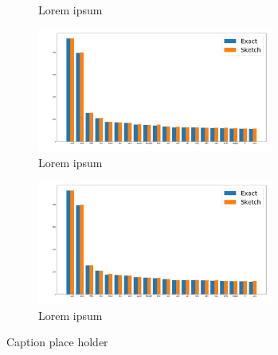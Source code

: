 \documentclass[shortpaper]{revdetua}
\begin{document}
\begin{figure}[]
\begin{subfigure}[t]{0.5\textwidth}
        \caption{Lorem ipsum}
    \end{subfigure}
    \begin{subfigure}[t]{0.5\textwidth}
        \includegraphics[height=1.6in]{englishAlice1000_8.png}
        \caption{Lorem ipsum}
    \end{subfigure}
    \begin{subfigure}[t]{0.5\textwidth}
        \includegraphics[height=1.6in]{englishAlice1000_10.png}
        \caption{Lorem ipsum}
    \end{subfigure}
    \caption{Caption place holder}
    \label{fig:1}
\end{figure}
\end{document}
